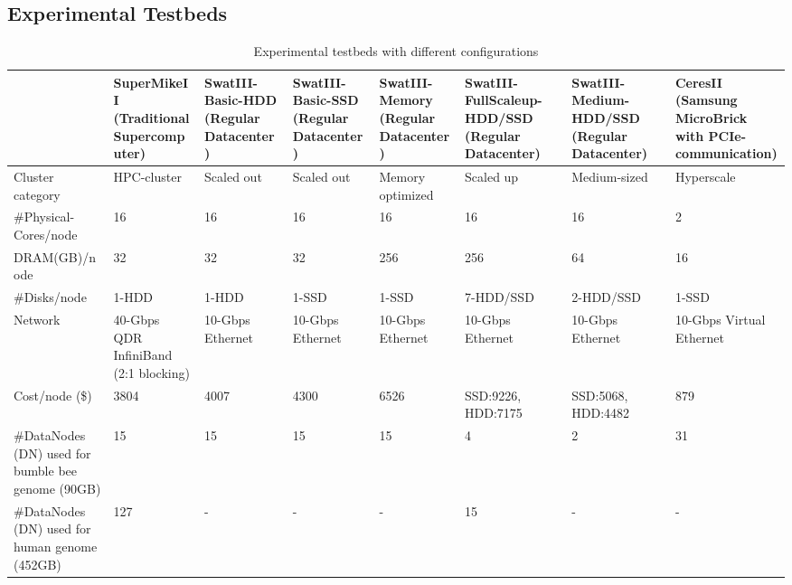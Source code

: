 \documentclass[conference]{IEEEtran}
\begin{document}
\subsection {Experimental Testbeds}
\begin{table}
\begin{center}
    \begin{tabular}{ |p{3.2cm} | p{1.6cm} | p{1.6cm} | p{1.6cm} | p{1.9cm} | p{1.6cm} | p{1.6cm}| p{1.9cm}|} \hline
    & SuperMikeII (Traditional Supercomputer) & SwatIII-Basic-HDD (Regular Datacenter) & SwatIII-Basic-SSD (Regular Datacenter)  & SwatIII-Memory (Regular Datacenter) & SwatIII-FullScaleup-HDD/SSD (Regular Datacenter) & SwatIII-Medium-HDD/SSD (Regular Datacenter) & CeresII (Samsung MicroBrick with PCIe-communication) \\ \hline
    Cluster category & HPC-cluster & Scaled out & Scaled out & Memory optimized & Scaled up & Medium-sized & Hyperscale\\ \hline  
    \#Physical-Cores/node & 16 & 16 & 16 & 16 & 16 & 16 & 2 \\ \hline %
    DRAM(GB)/node & 32 & 32 & 32 & 256 & 256 & 64 & 16  \\ \hline
    \#Disks/node & 1-HDD & 1-HDD & 1-SSD & 1-SSD & 7-HDD/SSD & 2-HDD/SSD & 1-SSD \\ \hline
    Network & 40-Gbps QDR InfiniBand (2:1 blocking) & 10-Gbps Ethernet & 10-Gbps Ethernet & 10-Gbps Ethernet & 10-Gbps Ethernet & 10-Gbps Ethernet & 10-Gbps Virtual Ethernet\\ \hline %
   Cost/node (\$) & 3804 & 4007 & 4300 & 6526 & SSD:9226, HDD:7175 & SSD:5068, HDD:4482 & 879\\ \hline
    \#DataNodes (DN) used for bumble bee genome (90GB) & 15 & 15 & 15 & 15 & 4 & 2 & 31 \\ \hline
    \#DataNodes (DN) used for human genome (452GB)& 127 & - & - & - & 15 & - & - \\ \hline
    \end{tabular}
    \caption{Experimental testbeds with different configurations}
	\label{table:Experimentaltestbeds}
\end{center}
\vspace{-1.5em}
\end{table}
\end{document}
